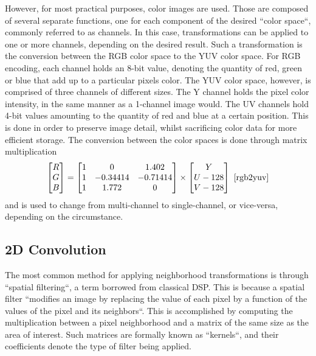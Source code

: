However, for most practical purposes, color images are used. Those are composed of several separate functions,
one for each component of the desired ``color space``, commonly referred to as channels. In this case,
transformations can be applied to one or more channels, depending on the desired result. Such a transformation
is the conversion between the RGB color space to the YUV color space. For RGB encoding, each channel holds
an 8-bit value, denoting the quantity of red, green or blue that add up to a particular pixels color. The YUV
color space, however, is comprised of three channels of different sizes. The Y channel holds the pixel color
intensity, in the same manner as a 1-channel image would. The UV channels hold 4-bit values amounting to the
quantity of red and blue at a certain position. This is done in order to preserve image detail, whilst
sacrificing color data for more efficient storage. The conversion between the color spaces is done through
matrix multiplication
\[
	\begin{bmatrix}
		R \\
		G \\
		B \\
	\end{bmatrix}
	=
	\begin{bmatrix}
		1 & 0        & 1.402    \\
		1 & -0.34414 & -0.71414 \\
		1 & 1.772    & 0        \\
	\end{bmatrix}
	\times
	\begin{bmatrix}
		Y       \\
		U - 128 \\
		V - 128 \\
	\end{bmatrix}
	\text{ \cite{rgb2yuv}}
\]
and is used to change from multi-channel to single-channel, or vice-versa, depending on the circumstance.
\cite{rgb2yuv}

\subsection{2D Convolution}

The most common method for applying neighborhood transformations is through ``spatial filtering``, a term
borrowed from classical DSP. This is because a spatial filter ``modifies an image by replacing the value
of each pixel by a function of the values of the pixel and its neighbors``. This is accomplished by computing
the multiplication between a pixel neighborhood and a matrix of the same size as the area of interest. Such
matrices are formally known as ``kernels``, and their coefficients denote the type of filter being applied.
\cite{dipBook}

